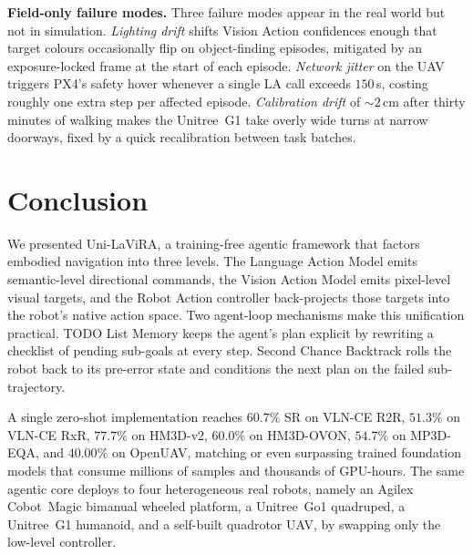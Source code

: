 \documentclass[conference]{IEEEtran}
\newcommand{\ourmethod}{Uni-LaViRA\xspace}
\begin{document}
\textbf{Field-only failure modes.} Three failure modes appear in the real
world but not in simulation. \emph{Lighting drift} shifts Vision Action
confidences enough that target colours occasionally flip on object-finding
episodes, mitigated by an exposure-locked frame at the start of each episode.
\emph{Network jitter} on the UAV triggers PX4's safety hover whenever a single
LA call exceeds $150$\,s, costing roughly one extra step per affected episode.
\emph{Calibration drift} of $\sim$$2$\,cm after thirty
minutes of walking makes the Unitree~G1 take overly wide turns at narrow
doorways, fixed by a quick recalibration between task batches.

\section{Conclusion}
\label{sec:conclusion}

We presented \ourmethod, a training-free agentic framework that factors
embodied navigation into three levels. The Language Action Model emits
semantic-level directional commands, the Vision Action Model emits pixel-level
visual targets, and the Robot Action controller back-projects those targets
into the robot's native action space. Two agent-loop mechanisms make this
unification practical. TODO List Memory keeps the agent's plan explicit by
rewriting a checklist of pending sub-goals at every step. Second Chance
Backtrack rolls the robot back to its pre-error state and conditions the next
plan on the failed sub-trajectory.

A single zero-shot implementation reaches $60.7\%$ SR on VLN-CE R2R, $51.3\%$
on VLN-CE RxR, $77.7\%$ on HM3D-v2, $60.0\%$ on HM3D-OVON, $54.7\%$ on
MP3D-EQA, and $40.00\%$ on OpenUAV, matching or even surpassing trained
foundation models that consume millions of samples and thousands of GPU-hours. The same agentic core
deploys to four heterogeneous real robots, namely an Agilex Cobot~Magic
bimanual wheeled platform, a Unitree~Go1 quadruped, a Unitree~G1 humanoid, and
a self-built quadrotor UAV, by swapping only the low-level controller.
\end{document}
